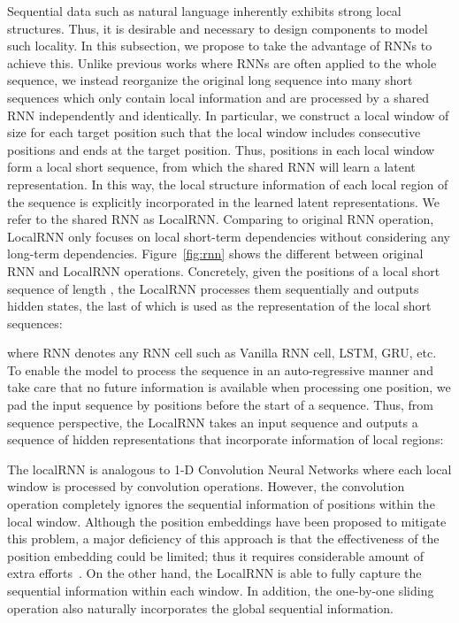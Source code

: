 \documentclass{article} \usepackage{iclr2019_conference,times}
\begin{document}
Sequential data such as natural language inherently exhibits strong local structures. Thus, it is desirable and necessary to design components to model such locality. In this subsection, we propose to take the advantage of RNNs to achieve this. Unlike previous works where RNNs are often applied to the whole sequence, we instead reorganize the original long sequence into many short sequences which only contain local information and are processed by a shared RNN independently and identically. In particular, we construct a local window of size  for each target position such that the local window includes  consecutive positions and ends at the target position. Thus, positions in each local window form a local short sequence, from which the shared RNN will learn a latent representation. In this way, the local structure information of each local region of the sequence is explicitly incorporated in the learned latent representations. We refer to the shared RNN as LocalRNN. Comparing to original RNN operation, LocalRNN only focuses on local short-term dependencies without considering any long-term dependencies. Figure~\ref{fig:rnn} shows the different between original RNN and LocalRNN operations. Concretely, given the positions  of a local short sequence of length , the LocalRNN processes them sequentially and outputs  hidden states, the last of which is used as the representation of the local short sequences:

\noindent where RNN denotes any RNN cell such as Vanilla RNN cell, LSTM, GRU, etc. To enable the model to process the sequence in an auto-regressive manner and take care that no future information is available when processing one position, we pad the input sequence
by  positions before the start of a sequence. Thus, from sequence perspective, the LocalRNN takes an input sequence and outputs a sequence of hidden representations that incorporate information of local regions:


The localRNN is analogous to 1-D Convolution Neural Networks where each local window is processed by convolution operations. However, the convolution operation completely ignores the sequential information of positions within the local window. Although the position embeddings have been proposed to mitigate this problem, a major deficiency of this approach is that the effectiveness of the position embedding could be limited; thus it requires considerable amount of extra efforts~\citep{gehring2017convolutional}. On the other hand, the LocalRNN is able to fully capture the sequential information within each window. In addition, the one-by-one sliding operation also naturally incorporates the global sequential information.
\end{document}
